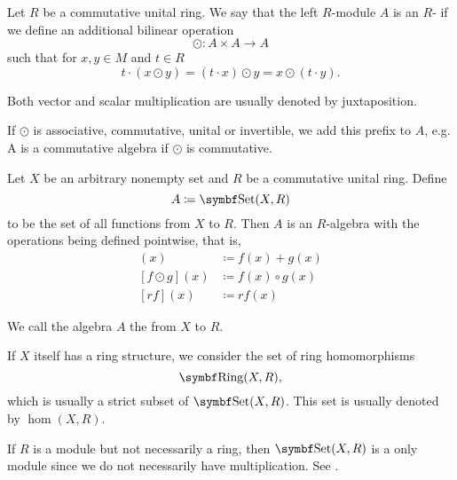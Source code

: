 \begin{definition}\label{def:algebra_over_ring}\cite[408]{Knapp2016BAlg}
  Let \( R \) be a commutative unital ring. We say that the left \( R \)-module \( A \) is an \( R \)- if we define an additional bilinear  operation
  \begin{equation*}
    \odot: A \times A \to A
  \end{equation*}
  such that for \( x, y \in M \) and \( t \in R \)
  \begin{equation*}
    t \cdot (x \odot y) = (t \cdot x) \odot y = x \odot (t \cdot y).
  \end{equation*}

  Both vector and scalar multiplication are usually denoted by juxtaposition.

  If \( \odot \) is associative, commutative, unital or invertible, we add this prefix to \( A \), e.g. A is a commutative algebra if \( \odot \) is commutative.
\end{definition}

\begin{proposition}\label{thm:functions_over_ring_form_algebra}
  Let \( X \) be an arbitrary nonempty set and \( R \) be a commutative unital ring. Define
  \begin{equation*}
    A \coloneqq \Cat{Set}(X, R)
  \end{equation*}
  to be the set of all functions from \( X \) to \( R \). Then \( A \) is an \( R \)-algebra with the operations being defined pointwise, that is,
  \begin{align*}
    [f + g](x) &\coloneqq f(x) + g(x) \\
    [f \odot g](x) &\coloneqq f(x) \circ g(x) \\
    [rf](x) &\coloneqq r f(x) 
  \end{align*}

  We call the algebra \( A \) the  from \( X \) to \( R \).

  If \( X \) itself has a ring structure, we consider the set of ring homomorphisms
  \begin{equation*}
    \Cat{Ring}(X, R),
  \end{equation*}
  which is usually a strict subset of \( \Cat{Set}(X, R) \). This set is usually denoted by \( \hom(X, R) \).

  If \( R \) is a module but not necessarily a ring, then \( \Cat{Set}(X, R) \) is a only module since we do not necessarily have multiplication. See .
\end{proposition}

